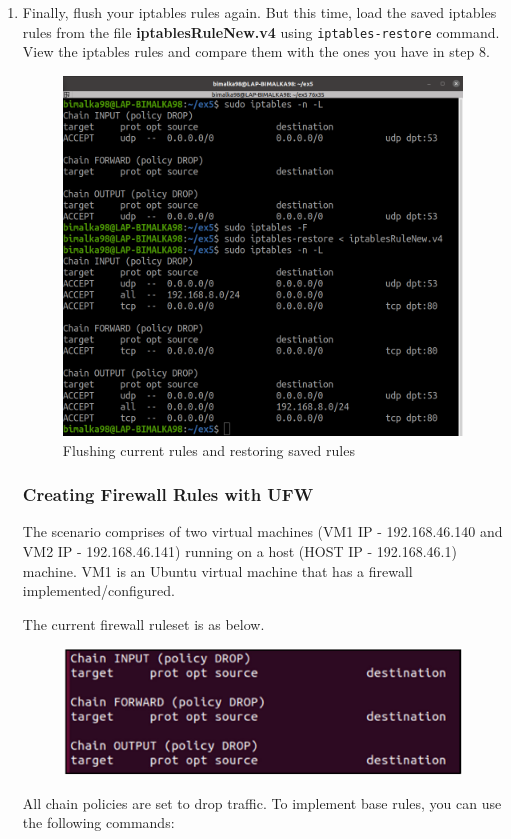 \documentclass[11pt,letterpaper]{article}
\newenvironment{answer}{\em \color{blue} \begin{adjustwidth}{1cm}{1cm}}{\end{adjustwidth}}
\begin{document}
\begin{enumerate}
		\item Finally, flush your iptables rules again. But this time, load the saved iptables rules from the file \textbf{iptablesRuleNew.v4} using \texttt{iptables-restore} command. View the iptables rules and compare them with the ones you have in step 8.
		\begin{answer}
			\begin{figure}[h]
				\centering
				\includegraphics[width=0.65\columnwidth]{images/part1/11.png}
				\caption{Flushing current rules and restoring saved rules}
			\end{figure}
		\end{answer}
		
		\subsubsection*{Creating Firewall Rules with UFW}
		
		The scenario comprises of two virtual machines (VM1 IP - 192.168.46.140 and VM2 IP - 192.168.46.141) running on a host (HOST IP - 192.168.46.1) machine. VM1 is an Ubuntu virtual machine that has a firewall implemented/configured. 
		
		The current firewall ruleset is as below.
		\begin{figure}[H]
			\centering
			\includegraphics[width=0.5\columnwidth]{images/ex5-firewall-rules.png}
		\end{figure}
		
		All chain policies are set to drop traffic. To implement base rules, you can use the following commands:
		

\end{enumerate}
\end{document}
